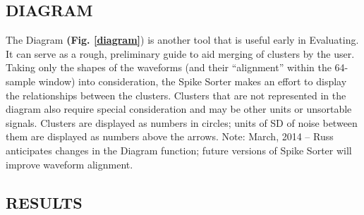 \documentclass[12pt]{article}
\begin{document}
\subsection{\sf DIAGRAM}
The Diagram \textbf{(Fig. \ref{diagram}}) is another tool that is
useful early in Evaluating. It can serve as a rough, preliminary guide
to aid merging of clusters by the user. Taking only the shapes of the
waveforms (and their ``alignment'' within the 64-sample window) into
consideration, the Spike Sorter makes an effort to display the
relationships between the clusters. Clusters that are not represented
in the diagram also require special consideration and may be other
units or unsortable signals. Clusters are displayed as numbers in
circles; units of SD of noise between them are displayed as numbers
above the arrows. Note: March, 2014 -- Russ anticipates changes in the
Diagram function; future versions of Spike Sorter will improve
waveform alignment.
\begin{center}
  \label{diagram}
\end{center}
\clearpage
\subsection{\sf RESULTS}
\end{document}
